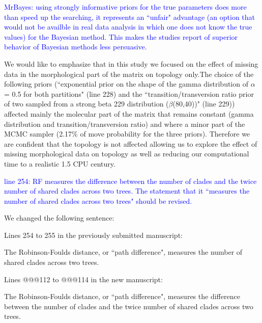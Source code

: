 \documentclass[11pt]{letter}
\begin{document}
\begin{letter}{}

\textcolor{blue}{MrBayes: using strongly informative priors for the true parameters does more than speed up the searching, it represents an ``unfair" advantage (an option that would not be availble in real data analysis in which one does not know the true values) for the Bayesian method. This makes the studies report of superior behavior of Bayesian methods less persuasive.}

We would like to emphasize that in this study we focused on the effect of missing data in the morphological part of the matrix on topology only.The choice of the following priors (``exponential prior on the shape of the gamma distribution of $\alpha$ = 0.5 for both partitions" (line 228) and the ``transition/transversion ratio prior of two sampled from a strong beta 229 distribution ($\beta$(80,40))" (line 229)) affected mainly the molecular part of the matrix that remains constant (gamma distribution and transition/transversion ratio) and where a minor part of the MCMC sampler (2.17\% of move probability for the three priors). Therefore we are confident that the topology is not affected allowing us to explore the effect of missing morphological data on topology as well as reducing our computational time to a realistic 1.5 CPU century.


\textcolor{blue}{line 254: RF measures the difference between the number of clades and the twice number of shared clades across two trees. The statement that it ``measures the number of shared clades across two trees" should be revised.}

We changed the following sentence:

Lines 254 to 255 in the previously submitted manuscript:

\hfill\begin{minipage}{\dimexpr\textwidth-1cm}
The Robinson-Foulds distance, or ``path difference", measures the number of shared clades across two trees.
\end{minipage}

Lines @@@112 to @@@114 in the new manuscript:

\hfill\begin{minipage}{\dimexpr\textwidth-1cm}
The Robinson-Foulds distance, or ``path difference", measures the difference between the number of clades and the twice number of shared clades across two trees.
\end{minipage}



\end{letter}
\end{document}
